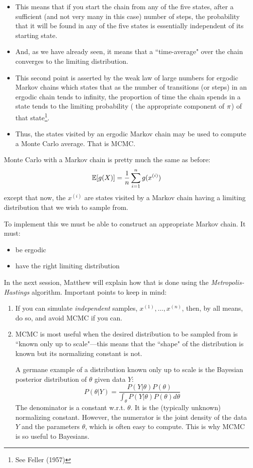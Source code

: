 \begin{itemize}
\item This means that if you start the chain from any of the five states, after a sufficient (and not very many in this case) number of steps, the probability that it will be found in any of the five states is essentially independent of its starting state.   

\item And, as we have already seen, it means that a ``time-average" over the chain converges to the limiting distribution. 

\item This second point is asserted by the weak law of large numbers for ergodic Markov chains which states that as the number of transitions (or steps) in an ergodic chain tends to infinity, the proportion of time the chain spends in a state tends to the limiting probability (\ie{} the appropriate component of ${\pi}$) of that state\footnote{See Feller (1957)}.  

\item Thus, the states visited by an ergodic Markov chain may be used to compute a Monte Carlo average.  That is MCMC.
\end{itemize}

Monte Carlo with a Markov chain is pretty much the same as before:
\[
	\Bbb{E}[g(X)] = \frac{1}{n}\sum_{i=1}^n g(x^{(i)})
\]
except that now, the $x^{(i)}$ are states visited by a Markov chain having a limiting distribution that we wish to sample from. 

To implement this we must be able to construct an appropriate Markov chain. It must:
\begin{itemize}
\item be ergodic
\item have the right limiting distribution
\end{itemize} 
In the next session, Matthew will explain how that is done using the
{\em Metropolis-Hastings} algorithm.  
\newpage
Important points to keep in mind:
\begin{enumerate}
\item If you can simulate {\em independent} samples, $x^{(1)},\ldots,x^{(n)}$, then, by all means, do so, and avoid MCMC if you can.
\item MCMC is most useful when the desired distribution to be sampled from is ``known only up to scale"---this means that the ``shape" of the distribution is known but its normalizing constant is not. 

A germane example of a distribution known only up to scale is the Bayesian posterior distribution of $\theta$ given data $Y$:
\[
	P(\theta|Y) = \frac{P(Y|\theta)P(\theta)}
		{\int_\theta P(Y|\theta)P(\theta)d\theta}
\] 
The denominator is a constant w.r.t. $\theta$.  It is the (typically unknown) normalizing constant.  However, the numerator is the joint density of the data $Y$ and the parameters $\theta$, which is often easy to compute. This is why MCMC is so useful to Bayesians.
\end{enumerate}

